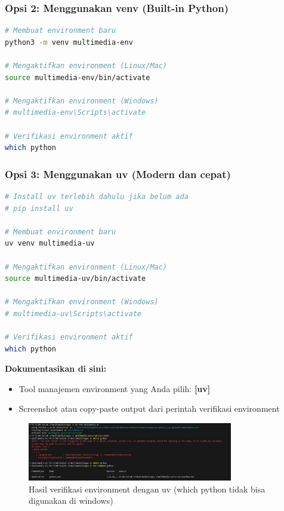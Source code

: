 \documentclass[11pt,a4paper]{article}
\begin{document}
\subsubsection{Opsi 2: Menggunakan venv (Built-in Python)}
\begin{lstlisting}[language=bash, caption=Membuat environment dengan venv]
# Membuat environment baru
python3 -m venv multimedia-env

# Mengaktifkan environment (Linux/Mac)
source multimedia-env/bin/activate

# Mengaktifkan environment (Windows)
# multimedia-env\Scripts\activate

# Verifikasi environment aktif
which python
\end{lstlisting}

\subsubsection{Opsi 3: Menggunakan uv (Modern dan cepat)}
\begin{lstlisting}[language=bash, caption=Membuat environment dengan uv]
# Install uv terlebih dahulu jika belum ada
# pip install uv

# Membuat environment baru
uv venv multimedia-uv

# Mengaktifkan environment (Linux/Mac)
source multimedia-uv/bin/activate

# Mengaktifkan environment (Windows)
# multimedia-uv\Scripts\activate

# Verifikasi environment aktif
which python
\end{lstlisting}

\textbf{Dokumentasikan di sini:}
\begin{itemize}
    \item Tool manajemen environment yang Anda pilih: \textbf{[uv]}
    \item Screenshot atau copy-paste output dari perintah verifikasi environment
    
\end{itemize}
\begin{figure}[H] 
    \centering
    \includegraphics[width=0.8\textwidth]{figure/ss1.jpg}
    \caption{Hasil verifikasi environment dengan uv (which python tidak bisa digunakan di windows)}
    \label{fig:ss1}
\end{figure}
\end{document}
